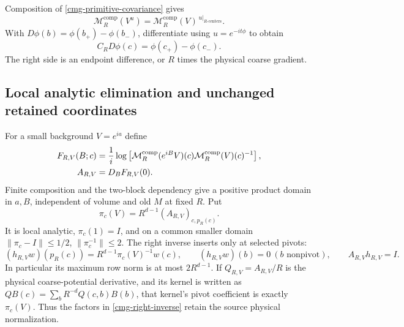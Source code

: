\documentclass[11pt]{article}
\theoremstyle{remark}
\begin{document}
Composition of \eqref{cmg-primitive-covariance} gives
\begin{equation}
 \mathcal M_R^{\mathrm{comp}}(V^u)=
 \mathcal M_R^{\mathrm{comp}}(V)^{\,u|_{R\text{-centers}}}.
 \label{cmg-composite-covariance}
\end{equation}
With $D\phi(b)=\phi(b_+)-\phi(b_-)$, differentiate using
$u=e^{-it\phi}$ to obtain
\begin{equation}
 C_RD\phi(c)=\phi(c_+)-\phi(c_-).
 \label{cmg-gradient}
\end{equation}
The right side is an endpoint difference, or $R$ times the physical
coarse gradient.

\subsection{Local analytic elimination and unchanged retained coordinates}
\label{cmg-chart-section}

For a small background $V=e^{ia}$ define
\begin{align}
 F_{R,V}(B;c)&=\frac1i\log\left[
 \mathcal M_R^{\mathrm{comp}}(e^{iB}V)(c)
 \mathcal M_R^{\mathrm{comp}}(V)(c)^{-1}\right],\notag\\
 A_{R,V}&=D_BF_{R,V}(0).
 \label{cmg-relative-map}
\end{align}
Finite composition and the two-block dependency give a positive
product domain in $a,B$, independent of volume and old $M$ at fixed
$R$. Put
\begin{equation}
 \pi_c(V)=R^{d-1}(A_{R,V})_{c,p_R(c)}.
 \label{cmg-pi}
\end{equation}
It is local analytic, $\pi_c(1)=I$, and on a common smaller domain
$\lVert\pi_c-I\rVert\le1/2$, $\lVert\pi_c^{-1}\rVert\le2$.
The right inverse inserts only at selected pivots:
\begin{equation}
 (h_{R,V}w)(p_R(c))=R^{d-1}\pi_c(V)^{-1}w(c),\qquad
 (h_{R,V}w)(b)=0\ (b\text{ nonpivot}),\qquad A_{R,V}h_{R,V}=I.
 \label{cmg-right-inverse}
\end{equation}
In particular its maximum row norm is at most $2R^{d-1}$.
If $Q_{R,V}=A_{R,V}/R$ is the physical coarse-potential derivative,
and its kernel is written as
$QB(c)=\sum_bR^{-d}Q(c,b)B(b)$, that kernel's pivot coefficient
is exactly $\pi_c(V)$. Thus the factors in
\eqref{cmg-right-inverse} retain the source physical normalization.
\end{document}
